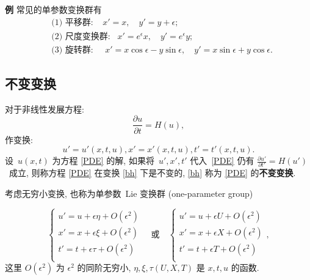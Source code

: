 \textbf{例} 常见的单参数变换群有
\begin{align*}
&\text{(1) 平移群:}  \;\;\;\; x'=x,\quad y'=y+\epsilon;\\
&\text{(2) 尺度变换群:}  \;\;\; x'=e^\epsilon x,\quad y'=e^\epsilon y;\\
&\text{(3) 旋转群:}  \;\;\;\; \; x'=x\cos\epsilon-y\sin\epsilon,\quad y'=x\sin\epsilon+y\cos\epsilon.
\end{align*}



\subsection{不变变换}
对于非线性发展方程:
\begin{equation}\label{PDE}
\frac{\partial u}{\partial t}=H(u),
\end{equation}
作变换:
\begin{equation}\label{bh}
u'=u'(x,t,u), x'=x'(x,t,u), t'=t'(x,t,u).
\end{equation}
设\ $u(x,t)$ 为方程 \eqref{PDE} 的解, 如果将\ $u',x',t'$ 代入\ \eqref{PDE} 仍有
$\frac{\partial u'}{\partial t'}=H(u')$\ 成立, 则称方程 \eqref{PDE} 在变换 \eqref{bh} 下是不变的, \eqref{bh} 称为 \eqref{PDE} 的\textbf{不变变换}.

考虑无穷小变换, 也称为单参数~Lie 变换群 (one-parameter group)

\begin{equation}\label{1.2-1}%
\begin{cases}
u'=u+\epsilon\eta+O(\epsilon^2)\\
x'=x+\epsilon\xi+O(\epsilon^2)\\
t'=t+\epsilon\tau+O(\epsilon^2)\\
\end{cases}
\quad\text{或}\quad
\begin{cases}
u'=u+\epsilon U+O(\epsilon^2)\\
x'=x+\epsilon X+O(\epsilon^2)\\
t'=t+\epsilon T+O(\epsilon^2)\\
\end{cases},
\end{equation}
这里 $O(\epsilon^2)$ 为 $\epsilon^2$ 的同阶无穷小, $\eta, \xi, \tau (U, X, T)$ 是 $x,t,u$ 的函数.

